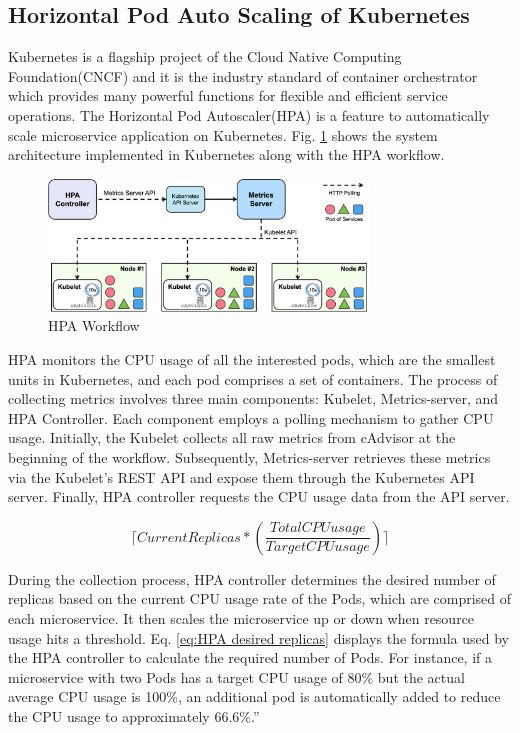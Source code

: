 \documentclass[conference]{IEEEtran}
\begin{document}
\subsection{Horizontal Pod Auto Scaling of Kubernetes}
Kubernetes is a flagship project of the Cloud Native Computing Foundation(CNCF) and it is the industry standard of container orchestrator which  provides many powerful functions for flexible and efficient service operations. The Horizontal Pod Autoscaler(HPA) is a feature to automatically scale microservice application on Kubernetes. Fig. \ref{fig:hpa system design}  shows the system architecture implemented in Kubernetes along with the HPA workflow.


\begin{figure}[ht]
    \centerline{\includegraphics[width=8.5cm]{leejaehong/images/background/k8s_system_design.png}}
    \caption{HPA Workflow}
    \label{fig:hpa system design}
\end{figure}


HPA monitors the CPU usage of all the interested pods, which are the smallest units in Kubernetes, and each pod comprises a set of containers. The process of collecting metrics involves three main components: Kubelet, Metrics-server, and HPA Controller. Each component employs a polling mechanism to gather CPU usage. Initially, the Kubelet collects all raw metrics from cAdvisor at the beginning of the workflow. Subsequently, Metrics-server retrieves these metrics via the Kubelet’s REST API and expose them through the Kubernetes API server. Finally, HPA controller requests the CPU usage data from the API server.


\begin{equation}
    {\lceil Current Replicas\ast \left ( \frac{ Total CPU usage}{Target CPU usage} \right ) \rceil }
    \label{eq:HPA desired replicas}
\end{equation}

During the collection process, HPA controller determines the desired number of replicas based on the current CPU usage rate of the Pods, which are comprised of each microservice. It then scales the microservice up or down when resource usage hits a threshold\cite{KubernetesHPA}. Eq. \ref{eq:HPA desired replicas} displays the formula used by the HPA controller to calculate the required number of Pods. For instance, if a microservice with two Pods has a target CPU usage of 80\% but the actual average CPU usage is 100\%, an additional pod is automatically added to reduce the CPU usage to approximately 66.6\%.”
\end{document}
